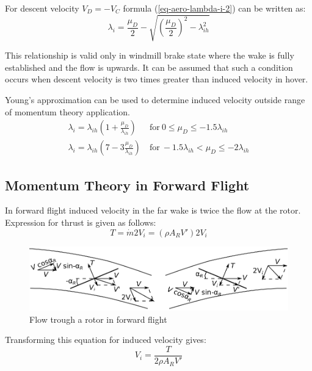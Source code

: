 For descent velocity $V_D = - V_C$ formula (\ref{eq-aero-lambda-i-2}) can be written as:
\begin{equation}
  \lambda_i
  =
  \frac{\mu_D}{2}
  -
  \sqrt{ \left( \frac{\mu_D}{2} \right)^2 - \lambda_{ih}^2 }
\end{equation}

This relationship is valid only in windmill brake state where the wake is fully established and the flow is upwards. \cite{Padfield2007} It can be assumed that such a condition occurs when descent velocity is two times greater than induced velocity in hover. \cite{Stepniewski1984}

Young’s approximation can be used to determine induced velocity outside range of momentum theory application. \cite{Padfield2007}
\begin{align}
  \lambda_i
  =
  \lambda_{ih} \left( 1 + \frac{\mu_D}{\lambda_{ih}} \right)
  &\mathrm{~for~} 0 \leq \mu_D \leq -1.5 \lambda_{ih} \\
  \lambda_i
  =
  \lambda_{ih} \left( 7 - 3 \frac{\mu_D}{\lambda_{ih}} \right)
  &\mathrm{~for~} -1.5 \lambda_{ih} < \mu_D \leq -2 \lambda_{ih}
\end{align}

\subsection{Momentum Theory in Forward Flight}

In forward flight induced velocity in the far wake is twice the flow at the rotor. \cite{Padfield2007} Expression for thrust is given as follows:
\begin{equation}
  T = \dot m 2 V_i = \left( \rho A_R V' \right) 2 V_i
\end{equation}

\begin{figure}
  \centering
  \includegraphics[width=120mm]{images/momentum_theory_forward.eps}
  \caption{Flow trough a rotor in forward flight}
\end{figure}

Transforming this equation for induced velocity gives:
\begin{equation}
  \label{eq-aero-lambda-i-3}
  V_i = \frac{T}{ 2 \rho A_R V' }
\end{equation}

